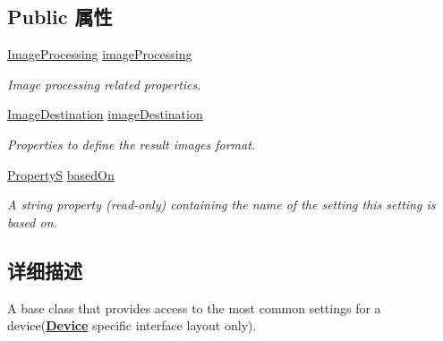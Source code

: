\subsection*{Public 属性}
\begin{DoxyCompactItemize}
\item 
\hypertarget{classmv_i_m_p_a_c_t_1_1acquire_1_1_full_settings_base_a66b80bc6dc7da3d77c8177dc888e0727}{\hyperlink{classmv_i_m_p_a_c_t_1_1acquire_1_1_image_processing}{Image\+Processing} \hyperlink{classmv_i_m_p_a_c_t_1_1acquire_1_1_full_settings_base_a66b80bc6dc7da3d77c8177dc888e0727}{image\+Processing}}\label{classmv_i_m_p_a_c_t_1_1acquire_1_1_full_settings_base_a66b80bc6dc7da3d77c8177dc888e0727}

\begin{DoxyCompactList}\small\item\em Image processing related properties. \end{DoxyCompactList}\item 
\hypertarget{classmv_i_m_p_a_c_t_1_1acquire_1_1_full_settings_base_a25c3befd98b23e80b2e60f255815ce69}{\hyperlink{classmv_i_m_p_a_c_t_1_1acquire_1_1_image_destination}{Image\+Destination} \hyperlink{classmv_i_m_p_a_c_t_1_1acquire_1_1_full_settings_base_a25c3befd98b23e80b2e60f255815ce69}{image\+Destination}}\label{classmv_i_m_p_a_c_t_1_1acquire_1_1_full_settings_base_a25c3befd98b23e80b2e60f255815ce69}

\begin{DoxyCompactList}\small\item\em Properties to define the result images format. \end{DoxyCompactList}\item 
\hypertarget{classmv_i_m_p_a_c_t_1_1acquire_1_1_full_settings_base_ac11de604078ffa2b18cca4441db2f196}{\hyperlink{classmv_i_m_p_a_c_t_1_1acquire_1_1_property_s}{Property\+S} \hyperlink{classmv_i_m_p_a_c_t_1_1acquire_1_1_full_settings_base_ac11de604078ffa2b18cca4441db2f196}{based\+On}}\label{classmv_i_m_p_a_c_t_1_1acquire_1_1_full_settings_base_ac11de604078ffa2b18cca4441db2f196}

\begin{DoxyCompactList}\small\item\em A string property {\bfseries }(read-\/only) containing the name of the setting this setting is based on. \end{DoxyCompactList}\end{DoxyCompactItemize}


\subsection{详细描述}
A base class that provides access to the most common settings for a device({\bfseries \hyperlink{classmv_i_m_p_a_c_t_1_1acquire_1_1_device}{Device}} specific interface layout only). 

